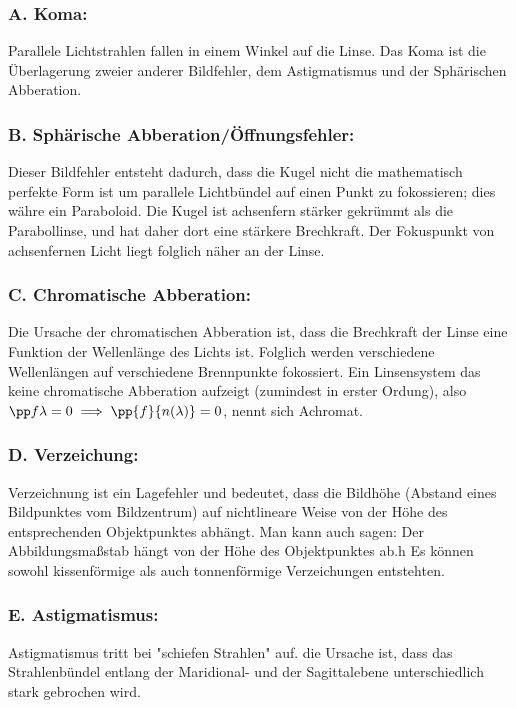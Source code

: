 \documentclass[twocolumn, unnumberedsubsub]{summery_5.0} %
\begin{document}
\subsubsection*{A. Koma:}
Parallele Lichtstrahlen fallen in einem Winkel auf die Linse. Das Koma ist die Überlagerung zweier anderer Bildfehler,
dem Astigmatismus und der Sphärischen Abberation.\tight

\subsubsection*{B. Sphärische Abberation/Öffnungsfehler:}
Dieser Bildfehler entsteht dadurch, dass die Kugel nicht die mathematisch perfekte Form 
ist um parallele Lichtbündel auf einen Punkt zu fokossieren; dies währe ein Paraboloid.
Die Kugel ist achsenfern stärker gekrümmt als die Parabollinse, und hat daher dort eine 
stärkere Brechkraft. Der Fokuspunkt von achsenfernen Licht liegt folglich näher an der Linse. \tight

\subsubsection*{C. Chromatische Abberation:}
Die Ursache der chromatischen Abberation ist, dass die Brechkraft der Linse eine Funktion der Wellenlänge des 
Lichts ist. Folglich werden verschiedene Wellenlängen auf verschiedene Brennpunkte fokossiert. 
Ein Linsensystem das keine chromatische Abberation aufzeigt (zumindest in erster Ordung), 
also \(\pp f\lambda=0 \implies \pp{f}{n(\lambda)} =0\), nennt sich Achromat.\tight

\subsubsection*{D. Verzeichung:}
Verzeichnung ist ein Lagefehler und bedeutet, dass die Bildhöhe (Abstand eines Bildpunktes vom Bildzentrum)
auf nichtlineare Weise von der Höhe des entsprechenden Objektpunktes abhängt. Man kann auch sagen: Der Abbildungsmaßstab hängt von
der Höhe des Objektpunktes ab.h Es können sowohl kissenförmige als auch tonnenförmige Verzeichungen entstehten.\tight

\subsubsection*{E. Astigmatismus:}
Astigmatismus tritt bei "schiefen Strahlen"{} auf. die Ursache ist, dass das 
Strahlenbündel entlang der Maridional- und der Sagittalebene unterschiedlich stark gebrochen wird.
\end{document}
